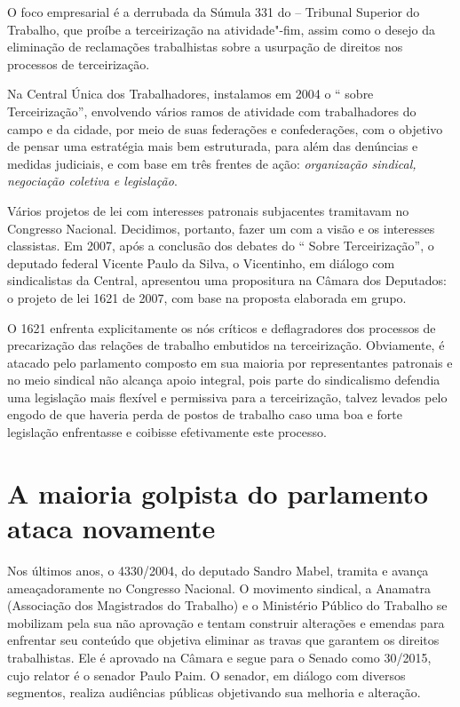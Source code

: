 O foco empresarial é a derrubada da Súmula 331 do  -- Tribunal
Superior do Trabalho, que proíbe a terceirização na atividade"-fim, assim
como o desejo da eliminação de reclamações trabalhistas sobre a
usurpação de direitos nos processos de terceirização.

Na Central Única dos Trabalhadores, instalamos em 2004 o ``
sobre Terceirização'', envolvendo vários ramos de atividade com
trabalhadores do campo e da cidade, por meio de suas federações e
confederações, com o objetivo de pensar uma estratégia mais bem
estruturada, para além das denúncias e medidas judiciais, e com base em
três frentes de ação: \emph{organização sindical, negociação coletiva e
legislação}.

Vários projetos de lei com interesses patronais subjacentes tramitavam no
Congresso Nacional. Decidimos, portanto, fazer um com a visão e os
interesses classistas. Em 2007, após a conclusão dos debates do ``
Sobre Terceirização'', o deputado federal Vicente Paulo da Silva, o
Vicentinho, em diálogo com sindicalistas da Central, apresentou uma
propositura na Câmara dos Deputados: o projeto de lei 1621 de 2007, com
base na proposta elaborada em grupo.

O  1621 enfrenta explicitamente os nós críticos e deflagradores dos
processos de precarização das relações de trabalho embutidos na
terceirização. Obviamente, é atacado pelo parlamento composto em sua
maioria por representantes patronais e no meio sindical não alcança
apoio integral, pois parte do sindicalismo defendia uma legislação mais
flexível e permissiva para a terceirização, talvez levados pelo engodo
de que haveria perda de postos de trabalho caso uma boa e forte
legislação enfrentasse e coibisse efetivamente este processo.

\section{A maioria golpista do parlamento ataca novamente}

Nos últimos anos, o  4330/2004, do deputado Sandro Mabel, tramita e
avança ameaçadoramente no Congresso Nacional. O movimento sindical, a
Anamatra (Associação dos Magistrados do Trabalho) e o Ministério Público
do Trabalho se mobilizam pela sua não aprovação e tentam construir
alterações e emendas para enfrentar seu conteúdo que objetiva eliminar
as travas que garantem os direitos trabalhistas. Ele é aprovado na
Câmara e segue para o Senado como 30/2015, cujo relator é o senador
Paulo Paim. O senador, em diálogo com diversos segmentos, realiza
audiências públicas objetivando sua melhoria e alteração.

